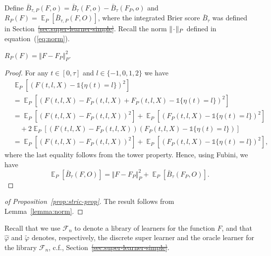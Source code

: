\documentclass[lineno]{biometrika}
\DeclareMathOperator{\E}{\mathbb{E}} %
\newcommand{\blank}{\makebox[1ex]{\textbf{$\cdot$}}}
\renewcommand{\phi}{\varphi}
\newcommand{\1}{\mathds{1}}
\providecommand{\DIFadd}[1]{{\protect\color{blue}\uwave{#1}}} %
\providecommand{\DIFdel}[1]{{\protect\color{red}\sout{#1}}}                      %
\providecommand{\DIFaddbegin}{} %
\providecommand{\DIFaddend}{} %
\providecommand{\DIFdelbegin}{} %
\providecommand{\DIFdelend}{} %
\begin{document}
Define
\( \bar{B}_{\tau,P}(F, o) = \bar{B}_{\tau}(F, o) -
\bar{B}_{\tau}(F_P, o) \) and
\( R_{P}(F) = \E_P{[\bar{B}_{\tau,P}(F, O)]} \), where the
integrated Brier score \( \bar{B}_{\tau} \) was defined in
Section~\DIFdelbegin \DIFdel{\ref{sec:super-learner-simple}}\DIFdelend \DIFaddbegin \DIFadd{\ref{sec:joint-survival-super-learner}}\DIFaddend . Recall the norm
\( \Vert \blank \Vert_{P}\) defined in
equation~(\ref{eq:norm}).

\begin{lemma}
  \label{lemma:norm}
  \( R_{P}(F) = \Vert F - F_P \Vert_{P}^2 \).
\end{lemma}
\begin{proof}
  For any \( t \in [0, \tau] \) and \( l\in \{-1,0,1,2\} \) we have
  \begin{align*}
    & \E_{P}{\left[ (F(t, l, X) - \1{\{\eta(t) = l \}})^2 \right]}
    \\
    & =    \E_{P}{\left[ (F(t, l, X) - F_P(t, l, X) + F_P(t, l, X) - \1{\{\eta(t) = l
      \}})^2 \right]}
    \\
    & =    \E_{P}{\left[ (F(t, l, X) - F_P(t, l, X))^2\right]}
      + \E_{P}{\left[ (F_P(t, l, X) - \1{\{\eta(t) = l \}})^2\right]}
    \\
    & \quad
      + 2\E_{P}{\left[ (F(t, l, X) - F_P(t, l, X))(F_P(t, l, X) - \1{\{\eta(t) = l
      \}})\right]}
    \\
    & =    \E_{P}{\left[ (F(t, l, X) - F_P(t, l, X))^2\right]}
      + \E_{P}{\left[ (F_P(t, l, X) - \1{\{\eta(t) = l \}})^2\right]},
  \end{align*}
  where the last equality follows from the tower property. Hence, using Fubini,
  we have
  \begin{equation*}
    \E_P{[\bar{B}_{\tau}(F, O)]}
    = \Vert F - F_P \Vert_{P}^2 + \E_P{[\bar{B}_{\tau}(F_P, O)]}.
  \end{equation*}
\end{proof}

\begin{proof}[of Proposition~\ref{prop:stric-prop}]
  The result follows from Lemma~\ref{lemma:norm}.
\end{proof}

Recall that we use \( \mathcal{F}_n \) to denote a library of learners for the
function \( F \), and that \( \hat{\phi} \) and \( \tilde{\phi} \) denotes,
respectively, the discrete super learner and the oracle learner for the library
\( \mathcal{F}_n \), c.f., Section~\DIFdelbegin \DIFdel{\ref{sec:super-learner-simple}}\DIFdelend \DIFaddbegin \DIFadd{\ref{sec:joint-survival-super-learner}}\DIFaddend .
\end{document}
